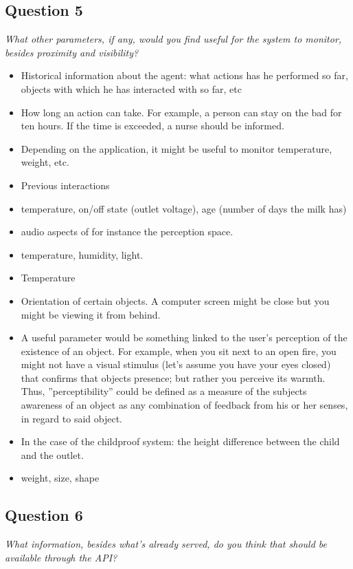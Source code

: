\subsection{Question 5}
\emph{What other parameters, if any, would you find useful for the system to monitor, besides proximity and visibility?}

\begin{itemize}
	\item Historical information about the agent: what actions has he performed so far, objects with which he has interacted with so far, etc
	\item How long an action can take. For example, a person can stay on the bad for ten hours. If the time is exceeded, a nurse should be informed.
	\item Depending on the application, it might be useful to monitor temperature, weight, etc.
	\item Previous interactions
	\item temperature, on/off state (outlet voltage), age (number of days the milk has)
	\item audio aspects of for instance the perception space.
	\item temperature, humidity, light.
	\item Temperature
	\item Orientation of certain objects. A computer screen might be close but you might be viewing it from behind.
	\item A useful parameter would be something linked to the user's perception of the existence of an object. For example, when you sit next to an open fire, you might not have a visual stimulus (let's assume you have your eyes closed) that confirms that objects presence; but rather you perceive its warmth. Thus, ''perceptibility'' could be defined as a measure of the subjects awareness of an object as any combination of feedback from his or her senses, in regard to said object.
	\item In the case of the childproof system: the height difference between the child and the outlet.
	\item weight, size, shape
\end{itemize}

\subsection{Question 6}
\emph{What information, besides what's already served, do you think that should be available through the API?}


